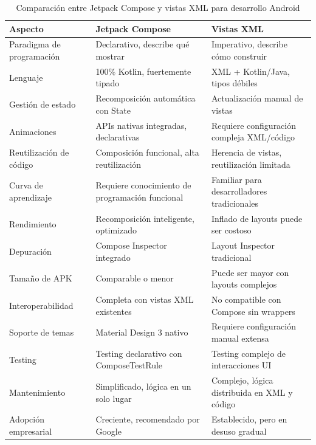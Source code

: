 \begin{table}[ht]
\centering
\caption{Comparación entre Jetpack Compose y vistas XML para desarrollo Android}
\label{tab:comparacion_compose_xml}
\begin{tabular}{|p{}|p{}|p{}|}
\hline
\textbf{Aspecto}{\cellcolor[gray]{0.9}} & \textbf{Jetpack Compose}{\cellcolor[gray]{0.9}} & \textbf{Vistas XML}{\cellcolor[gray]{0.9}} \\
\hline
Paradigma de programación & Declarativo, describe qué mostrar & Imperativo, describe cómo construir \\
\hline
Lenguaje & 100\% Kotlin, fuertemente tipado & XML + Kotlin/Java, tipos débiles \\
\hline
Gestión de estado & Recomposición automática con State & Actualización manual de vistas \\
\hline
Animaciones & APIs nativas integradas, declarativas & Requiere configuración compleja XML/código \\
\hline
Reutilización de código & Composición funcional, alta reutilización & Herencia de vistas, reutilización limitada \\
\hline
Curva de aprendizaje & Requiere conocimiento de programación funcional & Familiar para desarrolladores tradicionales \\
\hline
Rendimiento & Recomposición inteligente, optimizado & Inflado de layouts puede ser costoso \\
\hline
Depuración & Compose Inspector integrado & Layout Inspector tradicional \\ 
\hline
Tamaño de APK & Comparable o menor & Puede ser mayor con layouts complejos \\
\hline
Interoperabilidad & Completa con vistas XML existentes & No compatible con Compose sin wrappers \\
\hline
Soporte de temas & Material Design 3 nativo & Requiere configuración manual extensa \\
\hline
Testing & Testing declarativo con ComposeTestRule & Testing complejo de interacciones UI \\
\hline
Mantenimiento & Simplificado, lógica en un solo lugar & Complejo, lógica distribuida en XML y código \\
\hline
Adopción empresarial & Creciente, recomendado por Google & Establecido, pero en desuso gradual \\
\hline
\end{tabular}
\end{table}

